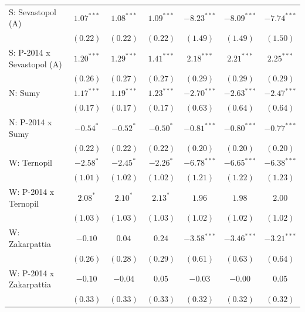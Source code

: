 \begin{table}
\begin{center}
\begin{small}
\begin{tabular}{l c c c c c c}
S: Sevastopol (A)           & $1.07^{***}$  & $1.08^{***}$ & $1.09^{***}$   & $-8.23^{***}$ & $-8.09^{***}$ & $-7.74^{***}$ \\
                            & $(0.22)$      & $(0.22)$     & $(0.22)$       & $(1.49)$      & $(1.49)$      & $(1.50)$      \\
S: P-2014 x Sevastopol (A)  & $1.20^{***}$  & $1.29^{***}$ & $1.41^{***}$   & $2.18^{***}$  & $2.21^{***}$  & $2.25^{***}$  \\
                            & $(0.26)$      & $(0.27)$     & $(0.27)$       & $(0.29)$      & $(0.29)$      & $(0.29)$      \\
N: Sumy                     & $1.17^{***}$  & $1.19^{***}$ & $1.23^{***}$   & $-2.70^{***}$ & $-2.63^{***}$ & $-2.47^{***}$ \\
                            & $(0.17)$      & $(0.17)$     & $(0.17)$       & $(0.63)$      & $(0.64)$      & $(0.64)$      \\
N: P-2014 x Sumy            & $-0.54^{*}$   & $-0.52^{*}$  & $-0.50^{*}$    & $-0.81^{***}$ & $-0.80^{***}$ & $-0.77^{***}$ \\
                            & $(0.22)$      & $(0.22)$     & $(0.22)$       & $(0.20)$      & $(0.20)$      & $(0.20)$      \\
W: Ternopil                 & $-2.58^{*}$   & $-2.45^{*}$  & $-2.26^{*}$    & $-6.78^{***}$ & $-6.65^{***}$ & $-6.38^{***}$ \\
                            & $(1.01)$      & $(1.02)$     & $(1.02)$       & $(1.21)$      & $(1.22)$      & $(1.23)$      \\
W: P-2014 x Ternopil        & $2.08^{*}$    & $2.10^{*}$   & $2.13^{*}$     & $1.96$        & $1.98$        & $2.00$        \\
                            & $(1.03)$      & $(1.03)$     & $(1.03)$       & $(1.02)$      & $(1.02)$      & $(1.02)$      \\
W: Zakarpattia              & $-0.10$       & $0.04$       & $0.24$         & $-3.58^{***}$ & $-3.46^{***}$ & $-3.21^{***}$ \\
                            & $(0.26)$      & $(0.28)$     & $(0.29)$       & $(0.61)$      & $(0.63)$      & $(0.64)$      \\
W: P-2014 x Zakarpattia     & $-0.10$       & $-0.04$      & $0.05$         & $-0.03$       & $-0.00$       & $0.05$        \\
                            & $(0.33)$      & $(0.33)$     & $(0.33)$       & $(0.32)$      & $(0.32)$      & $(0.32)$      \\

\end{tabular}
\end{small}
\end{center}
\end{table}
